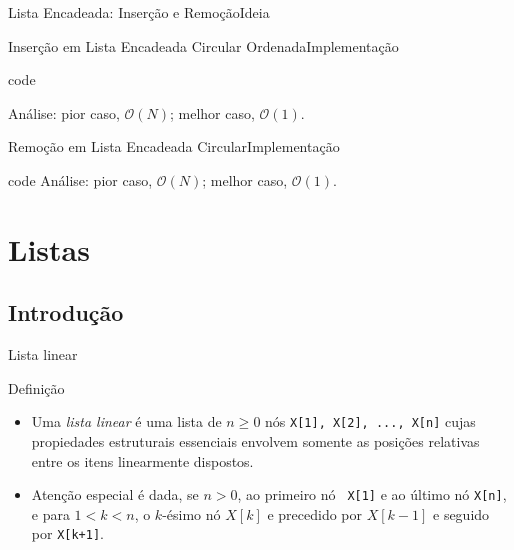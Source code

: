 \begin{frame}[fragile]{Lista Encadeada: Inserção e Remoção}{Ideia}
\end{frame}



\begin{frame}[fragile]{Inserção em Lista Encadeada Circular Ordenada}{Implementação}

%
  code
  
Análise: pior caso, $\mathcal{O}(N)$; melhor caso, $\mathcal{O}(1)$.

\end{frame}


\begin{frame}[fragile]{Remoção em Lista Encadeada Circular}{Implementação}

%
code
Análise: pior caso, $\mathcal{O}(N)$; melhor caso, $\mathcal{O}(1)$.

\end{frame}




\section{Listas}

\subsection{Introdução}

\begin{frame}{Lista linear}
\begin{block}{Definição}
\begin{itemize}
\item Uma {\em lista linear} é uma lista de $n \geq 0 $ nós {\tt X[1],
X[2], ..., X[n]} cujas propiedades estruturais essenciais envolvem
somente as posições relativas entre os itens linearmente dispostos.
\item Atenção especial é dada, se $n > 0$, ao primeiro nó {\tt
X[1]} e ao último nó {\tt X[n]}, e para $1 < k < n$, o $k$-ésimo nó
$X[k]$ e precedido por $X[k-1]$ e seguido por {\tt X[k+1]}.
\end{itemize}
\end{block}
\end{frame}

